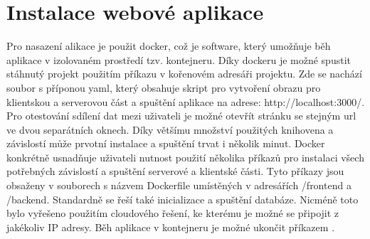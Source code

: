 \chapter{Instalace webové aplikace}
\label{sec:docker}
Pro nasazení alikace je použit docker, což je software, který umožňuje běh aplikace v izolovaném prostředí tzv. kontejneru. Díky dockeru je možné spustit stáhnutý projekt použitím příkazu  v kořenovém adresáři projektu. Zde se nachází soubor s příponou yaml, který obsahuje skript pro vytvoření obrazu pro klientskou a serverovou část a spuštění aplikace na adrese: http://localhost:3000/. Pro otestování sdílení dat mezi uživateli je možné otevřít stránku se stejným url ve dvou separátních oknech. Díky většímu množství použitých knihovena a závislostí může prvotní instalace a spuštění trvat i několik minut. Docker konkrétně usnadňuje uživateli nutnost použití několika příkazů pro instalaci všech potřebných závislostí a spuštění serverové a klientské části. Tyto příkazy jsou obsaženy v souborech s názvem Dockerfile umístěných v adresářích /frontend a /backend. Standardně se řeší také inicializace a spuštění databáze. Nicméně toto bylo vyřešeno použitím cloudového řešení, ke kterému je možné se připojit z jakékoliv IP adresy. Běh aplikace v kontejneru je možné ukončit příkazem .
